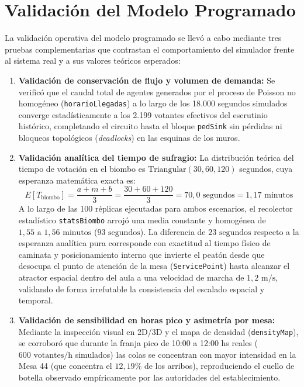 \documentclass[11pt,a4paper]{article}
\begin{document}
\section{Validación del Modelo Programado}
La validación operativa del modelo programado se llevó a cabo mediante tres pruebas complementarias que contrastan el comportamiento del simulador frente al sistema real y a sus valores teóricos esperados:
\begin{enumerate}
    \item \textbf{Validación de conservación de flujo y volumen de demanda:} Se verificó que el caudal total de agentes generados por el proceso de Poisson no homogéneo (\texttt{horarioLlegadas}) a lo largo de los 18.000 segundos simulados converge estadísticamente a los 2.199 votantes efectivos del escrutinio histórico, completando el circuito hasta el bloque \texttt{pedSink} sin pérdidas ni bloqueos topológicos (\textit{deadlocks}) en las esquinas de los muros.
    \item \textbf{Validación analítica del tiempo de sufragio:} La distribución teórica del tiempo de votación en el biombo es $\text{Triangular}(30, 60, 120)$ segundos, cuya esperanza matemática exacta es:
    \begin{equation}
        E[T_{\text{biombo}}] = \frac{a + m + b}{3} = \frac{30 + 60 + 120}{3} = 70{,}0\text{ segundos} = 1{,}17\text{ minutos}
    \end{equation}
    A lo largo de las 100 réplicas ejecutadas para ambos escenarios, el recolector estadístico \texttt{statsBiombo} arrojó una media constante y homogénea de $1{,}55\text{ a }1{,}56\text{ minutos}$ ($93\text{ segundos}$). La diferencia de $23\text{ segundos}$ respecto a la esperanza analítica pura corresponde con exactitud al tiempo físico de caminata y posicionamiento interno que invierte el peatón desde que desocupa el punto de atención de la mesa (\texttt{ServicePoint}) hasta alcanzar el atractor espacial dentro del aula a una velocidad de marcha de $1{,}2\text{ m/s}$, validando de forma irrefutable la consistencia del escalado espacial y temporal.
    \item \textbf{Validación de sensibilidad en horas pico y asimetría por mesa:} Mediante la inspección visual en 2D/3D y el mapa de densidad (\texttt{densityMap}), se corroboró que durante la franja pico de 10:00 a 12:00 hs reales ($600\text{ votantes/h}$ simulados) las colas se concentran con mayor intensidad en la Mesa 44 (que concentra el $12{,}19\%$ de los arribos), reproduciendo el cuello de botella observado empíricamente por las autoridades del establecimiento.
\end{enumerate}
\end{document}
